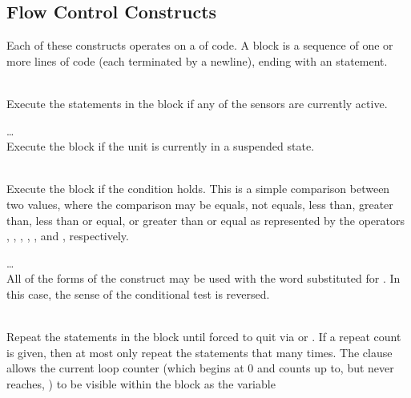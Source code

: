 \subsection*{Flow Control Constructs}


Each of these constructs operates on a 
of code.  A block is a sequence of one or more lines of code (each terminated
by a newline), ending with an 
statement.


\begin{list}{}{}
\item[{\codetype{IF SENSOR }\Var*{s1}\codetype{ \textnormal{[}OR }\Var*{s2}\codetype{\textnormal{] [\dots ]}: \textnormal{\dots } END}}]\hfill\\
Execute the statements in the block if any of the sensors are currently active.
\item[{\codetype{IF SUSPENDED: }\dots \codetype{ END}}]\hfill\\
Execute the block if the unit is currently in a suspended state.
\item[{\codetype{IF }\Var*{condition}\codetype{: \textnormal{\dots } END}}]\hfill\\
Execute the block if the condition holds. This is a simple comparison between
two values, where the comparison may be equals, not equals, less than, greater than,
less than or equal, or greater than or equal as represented by the operators
\codetype{==},
\codetype{!=},
\codetype{<},
\codetype{>},
\codetype{<=},
and
\codetype{>=},
respectively.
\item[{\codetype{UNLESS }\dots}]\hfill\\
All of the forms of the
construct may be used with the word 
substituted for
.
In this case, the sense of the conditional test is reversed.
\item[{\codetype{REPEAT \textnormal{[}}\Var*{n}\codetype{ \textnormal{[}TIME\textnormal{[}S\textnormal{]]} \textnormal{[}AS }\Var*{var}\codetype{\textnormal{]}: \textnormal{\dots } END}}]\hfill\\
Repeat the statements in the block until forced to quit via 
or
.
If a repeat count
is given, then at most only repeat the statements that many times.
The 
clause allows the current loop counter (which begins at 0 and counts up to, 
but never reaches,
)
to be visible within the block as the variable

\end{list}
